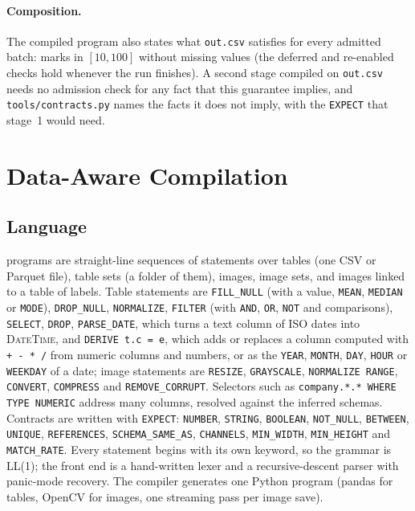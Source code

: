 \paragraph{Composition.} The compiled program also states what \texttt{out.csv} satisfies for every
admitted batch: marks in $[10,100]$ without missing values (the deferred and re-enabled checks hold
whenever the run finishes). A second stage compiled on \texttt{out.csv} needs no admission check for
any fact that this guarantee implies, and \texttt{tools/contracts.py} names the facts it does not
imply, with the \texttt{EXPECT} that stage~1 would need.

\section{Data-Aware Compilation}\label{sec:lang}

\subsection{Language}
\PL programs are straight-line sequences of statements over tables (one CSV or Parquet file),
table sets (a folder of them), images, image sets, and images linked to a table of labels. Table
statements are \texttt{FILL\_NULL} (with a value, \texttt{MEAN}, \texttt{MEDIAN} or \texttt{MODE}),
\texttt{DROP\_NULL}, \texttt{NORMALIZE}, \texttt{FILTER} (with \texttt{AND}, \texttt{OR},
\texttt{NOT} and comparisons), \texttt{SELECT}, \texttt{DROP}, \texttt{PARSE\_DATE}, which turns a text
column of ISO dates into \textsc{DateTime}, and \texttt{DERIVE t.c = e}, which adds or replaces a
column computed with \texttt{+ - * /} from numeric columns and numbers, or as the \texttt{YEAR},
\texttt{MONTH}, \texttt{DAY}, \texttt{HOUR} or \texttt{WEEKDAY} of a date; image statements are
\texttt{RESIZE}, \texttt{GRAYSCALE}, \texttt{NORMALIZE RANGE}, \texttt{CONVERT}, \texttt{COMPRESS}
and \texttt{REMOVE\_CORRUPT}. Selectors such as \texttt{company.*.* WHERE TYPE NUMERIC} address many
columns, resolved against the inferred schemas. Contracts are written with \texttt{EXPECT}:
\texttt{NUMBER}, \texttt{STRING}, \texttt{BOOLEAN}, \texttt{NOT\_NULL}, \texttt{BETWEEN},
\texttt{UNIQUE}, \texttt{REFERENCES}, \texttt{SCHEMA\_SAME\_AS}, \texttt{CHANNELS},
\texttt{MIN\_WIDTH}, \texttt{MIN\_HEIGHT} and \texttt{MATCH\_RATE}. Every statement begins with its
own keyword, so the grammar is LL(1); the front end is a hand-written lexer and a recursive-descent
parser with panic-mode recovery. The compiler generates one Python program (pandas for tables,
OpenCV for images, one streaming pass per image save).

